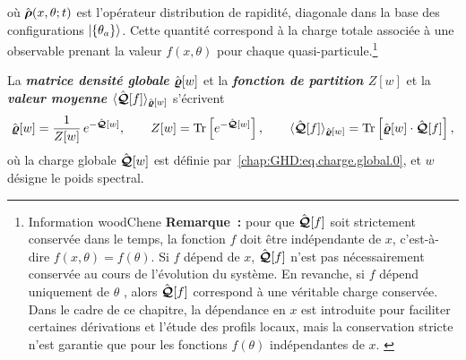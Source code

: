 {\begin{tikzpicture}[overlay]
    \end{tikzpicture}
    où $\hat{\boldsymbol{\rho}}(x,\theta ; t )$ est l'opérateur distribution de rapidité, diagonale dans la base des configurations $\ket{\{\theta_a\}}$.
    Cette quantité correspond à la charge totale associée à une observable prenant
    la valeur $f(x,\theta)$ pour chaque quasi-particule.\footnote{ \EncadreDeux
        {Information}{{\bf \textsf{} \textsf{}}}{woodChene}{
            \noindent\textbf{Remarque~:} pour que $\hat{\boldsymbol{\mathcal{Q}}}[f]$ soit
            strictement conservée dans le temps, la fonction $f$ doit être indépendante de
            $x$, c’est-à-dire $f(x,\theta) = f(\theta)$. Si $f$ dépend de $x$,
            $\hat{\boldsymbol{\mathcal{Q}}}[f]$ n’est pas nécessairement conservée au cours de
            l’évolution du système. En revanche, si $f$ dépend uniquement de $\theta$ ,
            alors $\hat{\boldsymbol{\mathcal{Q}}}[f]$ correspond à une véritable charge conservée.
            Dans le cadre de ce chapitre, la dépendance en $x$ est introduite pour
            faciliter certaines dérivations et l’étude des profils locaux, mais la
            conservation stricte n’est garantie que pour les fonctions $f(\theta)$
            indépendantes de $x$. } }

    \medskip

    La {\color{colorOne} \fontsize{8pt}{8pt}\selectfont \bfseries \emph{matrice
                densité globale} $\hat{\boldsymbol{\varrho}}[w]$} et la {\color{colorOne}
            \fontsize{8pt}{8pt}\selectfont \bfseries \emph{fonction de partition} $Z[w]$}
    et la {\color{colorOne} \fontsize{8pt}{8pt}\selectfont \bfseries \emph{valeur
                moyenne} $\langle \hat{\boldsymbol{\mathcal{Q}}}[f]\rangle_{\hat{\boldsymbol{\varrho}}[w]}$}
    s’écrivent
    \begin{equation}\label{chap:GHD:eq.charge.global.2}
        \hat{\boldsymbol{\varrho}}[w] = \frac{1}{Z[w]}\, e^{-\hat{\boldsymbol{\mathcal{Q}}}[w]},\qquad
        Z[w] = \mathrm{Tr} \left[ e^{-\hat{\boldsymbol{\mathcal{Q}}}[w]} \right],\qquad
        \langle \hat{\boldsymbol{\mathcal{Q}}}[f]\rangle_{\hat{\boldsymbol{\varrho}}[w]} = \mathrm{Tr} \left[ \hat{\boldsymbol{\varrho}}[w]\cdot \hat{\boldsymbol{\mathcal{Q}}}[f] \right],
    \end{equation}
    où la charge globale $\hat{\boldsymbol{\mathcal{Q}}}[w]$ est définie par~\eqref{chap:GHD:eq.charge.global.0}, et $w$ désigne le poids spectral.
}

